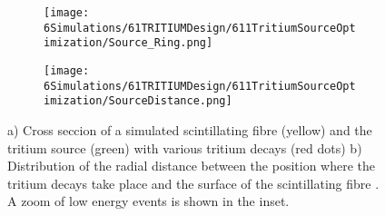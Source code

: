 \begin{figure}
\centering
    \begin{subfigure}[b]{0.45\textwidth}
    \centering
    \texttt{[image: 6Simulations/61TRITIUMDesign/611TritiumSourceOptimization/Source\_Ring.png]}  
    \caption{\label{subfig:TransversalCutTritiumSource}}
    \end{subfigure}
    \hfill
    \begin{subfigure}[b]{0.45\textwidth}
    \centering
    \texttt{[image: 6Simulations/61TRITIUMDesign/611TritiumSourceOptimization/SourceDistance.png]}  
    \caption{\label{subfig:DistanceDistributionTritiumSourceFiber}}
    \end{subfigure}
 \caption{a) Cross seccion of a simulated scintillating fibre (yellow) and the tritium source (green) with various tritium decays (red dots) b) Distribution of the radial distance between the position where the tritium decays take place and the surface of the scintillating fibre \cite{SimulationPaperCarlos}. A zoom of low energy events is shown in the inset.}
 \label{fig:TritiumSourceSimulated}
\end{figure}	

